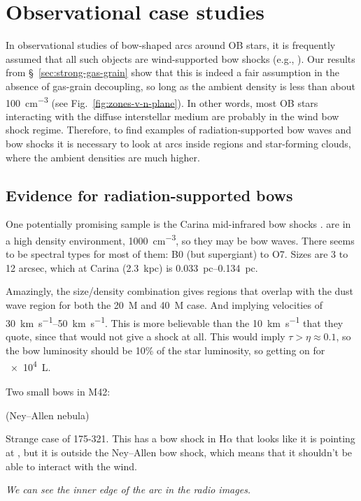 \section{Observational case studies}
\label{sec:case-studies}

In observational studies of bow-shaped arcs around OB stars, it is
frequently assumed that all such objects are wind-supported bow shocks
(e.g., \citealp{Kobulnicky:2016a}). Our results from
\S~\ref{sec:strong-gas-grain} show that this is indeed a fair
assumption in the absence of gas-grain decoupling, so long as the
ambient density is less than about \SI{100}{cm^{-3}} (see
Fig.~\ref{fig:zones-v-n-plane}). In other words, most OB stars
interacting with the diffuse interstellar medium are probably in the
wind bow shock regime.  Therefore, to find examples of
radiation-supported bow waves and bow shocks it is necessary to look
at arcs inside \hii{} regions and star-forming clouds, where the
ambient densities are much higher.

\subsection{Evidence for radiation-supported bows}

One potentially promising sample is the Carina mid-infrared bow shocks
\citep{Sexton:2015b}.   are in a high density environment,
\SI{1000}{cm^{-3}}, so they may be bow waves.  There seems to be
spectral types for most of them: B0 (but supergiant) to O7.  Sizes are
3 to 12 arcsec, which at Carina (\SI{2.3}{kpc}) is
\SIrange{0.033}{0.134}{pc}.

Amazingly, the size/density combination gives regions that overlap
with the dust wave region for both the \SI{20}{M_\odot} and \SI{40}{M_\odot}
case.  And implying velocities of \SIrange{30}{50}{km.s^{-1}}.  This
is more believable than the \SI{10}{km.s^{-1}} that they quote, since
that would not give a shock at all.  This would imply
\(\tau > \eta \approx 0.1\), so the bow luminosity should be 10\% of the star
luminosity, so getting on for \SI{e4}{L_\odot}.

Two small bows in M42:

\thD{} (Ney--Allen nebula) \citep{Robberto:2005a}

Strange case of 175-321.  This has a bow shock in H\(\alpha\) that looks
like it is pointing at \thD{}, but it is outside the Ney--Allen bow
shock, which means that it shouldn't be able to interact with the wind.

\textit{We can see the inner edge of the \thD{} arc in the radio images.}

